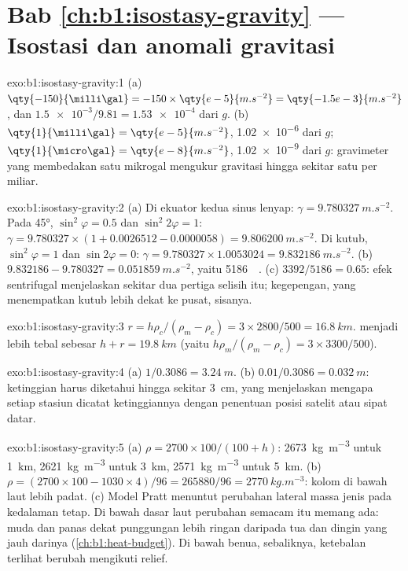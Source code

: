 \section*{Bab \ref{ch:b1:isostasy-gravity} --- Isostasi dan anomali gravitasi}

\begin{solution}{exo:b1:isostasy-gravity:1}
(a) $\qty{-150}{\milli\gal} = -150\times\qty{e-5}{m.s^{-2}} = \qty{-1.5e-3}{m.s^{-2}}$,
dan $\num{1.5e-3}/9.81 = \num{1.53e-4}$ dari $g$. (b) $\qty{1}{\milli\gal} =
\qty{e-5}{m.s^{-2}}$, \num{1.02e-6} dari $g$; $\qty{1}{\micro\gal} =
\qty{e-8}{m.s^{-2}}$, \num{1.02e-9} dari $g$: gravimeter yang membedakan satu mikrogal mengukur gravitasi hingga sekitar satu per miliar.
\end{solution}

\begin{solution}{exo:b1:isostasy-gravity:2}
(a) Di ekuator kedua sinus lenyap: $\gamma = \qty{9.780327}{m.s^{-2}}$. Pada
\ang{45}, $\sin^2\varphi = 0.5$ dan $\sin^2 2\varphi = 1$:
$\gamma = 9.780327\times(1 + 0.0026512 - 0.0000058) = \qty{9.806200}{m.s^{-2}}$.
Di kutub, $\sin^2\varphi = 1$ dan $\sin 2\varphi = 0$:
$\gamma = 9.780327\times1.0053024 = \qty{9.832186}{m.s^{-2}}$.
(b) $9.832186 - 9.780327 = \qty{0.051859}{m.s^{-2}}$, yaitu
\qty{5186}{\milli\gal}. (c) $3392/5186 = 0.65$: efek sentrifugal menjelaskan
sekitar dua pertiga selisih itu; kegepengan, yang menempatkan kutub lebih dekat ke
pusat, sisanya.
\end{solution}

\begin{solution}{exo:b1:isostasy-gravity:3}
$r = h\rho_c/(\rho_m - \rho_c) = 3\times2800/500 = \qty{16.8}{km}$.  menjadi
lebih tebal sebesar $h + r = \qty{19.8}{km}$ (yaitu $h\rho_m/(\rho_m - \rho_c) =
3\times3300/500$).
\end{solution}

\begin{solution}{exo:b1:isostasy-gravity:4}
(a) $1/0.3086 = \qty{3.24}{m}$. (b) $0.01/0.3086 = \qty{0.032}{m}$: ketinggian
harus diketahui hingga sekitar \qty{3}{cm}, yang menjelaskan mengapa setiap
stasiun dicatat ketinggiannya dengan penentuan posisi satelit atau sipat datar.
\end{solution}

\begin{solution}{exo:b1:isostasy-gravity:5}
(a) $\rho = 2700\times100/(100 + h)$: \qty{2673}{kg.m^{-3}} untuk \qty{1}{km},
\qty{2621}{kg.m^{-3}} untuk \qty{3}{km}, \qty{2571}{kg.m^{-3}} untuk \qty{5}{km}.
(b) $\rho = (2700\times100 - 1030\times4)/96 = \num{265880}/96 =
\qty{2770}{kg.m^{-3}}$: kolom di bawah laut lebih padat. (c) Model Pratt
menuntut perubahan lateral massa jenis pada kedalaman tetap. Di bawah dasar laut
perubahan semacam itu memang ada:  muda dan panas dekat punggungan lebih ringan daripada  tua dan dingin yang jauh darinya (\cref{ch:b1:heat-budget}).
Di bawah benua, sebaliknya, ketebalan  terlihat berubah mengikuti relief.
\end{solution}

